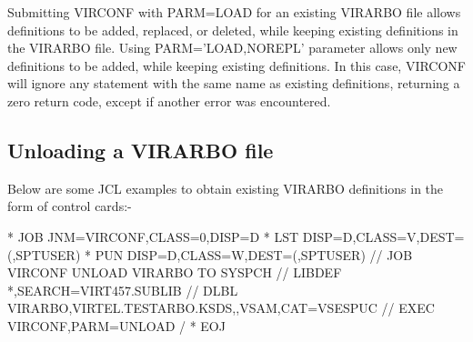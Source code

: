 \documentclass[letterpaper,10pt,english]{sphinxmanual}
\begin{document}

Submitting VIRCONF with PARM=LOAD for an existing VIRARBO file allows definitions to be added, replaced, or deleted, while keeping existing definitions in the VIRARBO file. Using PARM=’LOAD,NOREPL’ parameter allows only new definitions to be added, while keeping existing definitions. In this case, VIRCONF will ignore any statement with the same name as existing definitions, returning a zero return code, except if another error was encountered.


\subsection{Unloading a VIRARBO file}
\label{\detokenize{Installation_Guide:index-22}}\label{\detokenize{Installation_Guide:unloading-a-virarbo-file}}
Below are some JCL examples to obtain existing VIRARBO definitions in the form of control cards:-

\begin{sphinxVerbatim}[commandchars=\\\{\}]
* \PYGZdl{}\PYGZdl{} JOB JNM=VIRCONF,CLASS=0,DISP=D
* \PYGZdl{}\PYGZdl{} LST DISP=D,CLASS=V,DEST=(,SPTUSER)
* \PYGZdl{}\PYGZdl{} PUN DISP=D,CLASS=W,DEST=(,SPTUSER)
// JOB VIRCONF UNLOAD VIRARBO TO SYSPCH
// LIBDEF *,SEARCH=VIRT457.SUBLIB
// DLBL VIRARBO,\PYGZsq{}VIRTEL.TESTARBO.KSDS\PYGZsq{},,VSAM,CAT=VSESPUC
// EXEC VIRCONF,PARM=\PYGZsq{}UNLOAD\PYGZsq{}
/\PYGZam{}
* \PYGZdl{}\PYGZdl{} EOJ
\end{sphinxVerbatim}

\end{document}
